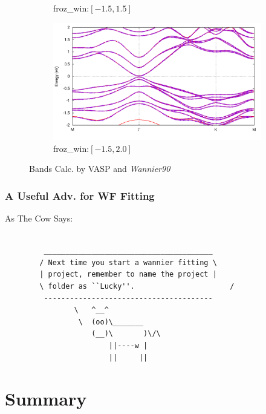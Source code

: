 \documentclass{beamer}
\begin{document}
\begin{frame}
\begin{figure}
\begin{subfigure}{0.42\textwidth}
         \caption{{\small froz\_win:\([-1.5,1.5]\)}}
      \end{subfigure}
      \begin{subfigure}{0.42\textwidth}
         \centering
         \includegraphics[width=\textwidth]{figure/Band_-1-5_to_2-0.png}
         \caption{{\small froz\_win:\([-1.5,2.0]\)}}
      \end{subfigure}
        \caption{Bands Calc. by VASP and \emph{Wannier90}}
    \end{figure}

  \end{frame}

  \begin{frame}[fragile]
    \frametitle{A Useful Adv. for WF Fitting}
    \begin{block}{As The Cow Says:}
      \begin{verbatim}

         _______________________________________
        / Next time you start a wannier fitting \
        | project, remember to name the project |
        \ folder as ``Lucky''.                      /
         ---------------------------------------
                \   ^__^
                 \  (oo)\_______
                    (__)\       )\/\
                        ||----w |
                        ||     ||
     \end{verbatim}
    \end{block}
  \end{frame}

  \section{Summary}
\end{document}
